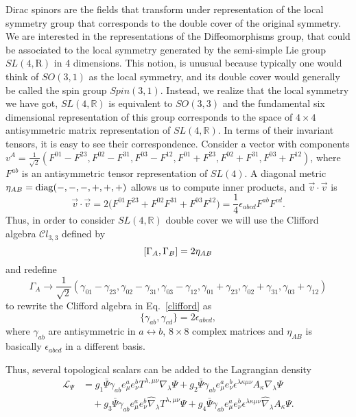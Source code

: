 \documentclass[twocolumn,aps,
  showpacs,showkeys,prd,superscriptaddress]{revtex4-1}
\begin{document}
Dirac spinors are the fields that transform under representation of the local symmetry group that corresponds to the double cover of the original symmetry. We are interested in the representations of the Diffeomorphisms group, that could be associated to the local symmetry generated by the semi-simple Lie group $SL(4,{\mathrm R})$ in 4 dimensions. This notion, is unusual because typically one would think of $SO(3,1)$ as the local symmetry, and its double cover would generally be called the spin group $Spin(3,1)$. Instead, we realize that the local symmetry we have got, $SL(4,{\mathbb R})$ is equivalent to $SO(3,3)$ and the fundamental six dimensional representation of this group corresponds to the space of $4\times 4$ antisymmetric matrix representation of $SL(4,{\mathbb R})$. In terms of their invariant tensors, it is easy to see their correspondence. Consider a vector with components 
$v^A=\frac{1}{\sqrt{2}}(F^{01}-F^{23},F^{02}-F^{31},F^{03}-F^{12},F^{01}+F^{23},F^{02}+F^{31},F^{03}+F^{12})$, where $F^{ab}$ is an antisymmetric tensor representation of $SL(4)$. 
A diagonal metric $\eta_{AB} = \operatorname{diag}(-,-,-,+,+,+)$ allows us to compute inner products, and $\vec{v}\cdot\vec{v}$ is 
\begin{dmath}
  \vec{v}\cdot\vec{v} = 2\bigg(F^{01}F^{23}+F^{02}F^{31}+F^{03}F^{12}\bigg)
  =\frac{1}{4}\epsilon_{abcd}F^{ab}F^{cd}.
\end{dmath}
Thus, in order to consider $SL(4,{\mathbb R})$ double cover we will use the Clifford algebra ${\mathcal Cl}_{3,3}$ defined by 
\begin{equation}
  \left[\Gamma_A,\Gamma_B\right] = 2 \eta_{AB}
  \label{clifford}
\end{equation}
and redefine
\begin{dmath}
  \Gamma_A\rightarrow\frac{1}{\sqrt{2}}(\gamma_{01}-\gamma_{23},\gamma_{02}-\gamma_{31},\gamma_{03}-\gamma_{12},\gamma_{01}
  +\gamma_{23},\gamma_{02}+\gamma_{31},\gamma_{03}+\gamma_{12})
\end{dmath} 
to rewrite the Clifford algebra in Eq.~\eqref{clifford} as 
\begin{equation}
  \label{Clifford} 
  \big\{\gamma_{ab},\gamma_{cd}\big\}=2\epsilon_{abcd},
\end{equation}
where $\gamma_{ab}$ are antisymmetric in $a\leftrightarrow b$, $8\times 8$  complex matrices and $\eta_{AB}$ is basically $\epsilon_{abcd} $ in a different basis.

Thus, several topological scalars can be added to the Lagrangian density
\begin{equation}
  \label{SpinorLagrangian}
  \begin{split}
    \mathcal{L}_\Psi &= g_1 \bar\Psi\gamma_{ab}e^a_{\mu}e^b_{\nu}T^{\lambda,\mu\nu}\nabla_\lambda\Psi
    +g_2 \bar\Psi\gamma_{ab}e^a_{\mu}e^b_{\nu}\epsilon^{\lambda\kappa\mu\nu}A_\kappa\nabla_\lambda\Psi \\
    & \quad +g_3 \bar\Psi\gamma_{ab}e^a_{\mu}e^b_{\nu}\hat\nabla_\lambda T^{\lambda,\mu\nu}\Psi
    +g_4 \bar\Psi\gamma_{ab}e^a_{\mu}e^b_{\nu}\epsilon^{\lambda\kappa\mu\nu}\hat\nabla_\lambda A_\kappa\Psi.
  \end{split}
\end{equation}



\nocite{%
  Gibbs:1995gj,sage}



\end{document}

